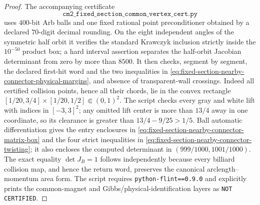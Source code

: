\documentclass[11pt]{article}
\begin{document}
\begin{proof}
The accompanying certificate
\[
 \texttt{cm2\_fixed\_section\_common\_vertex\_cert.py}
\]
uses $400$-bit Arb balls and one fixed rational point preconditioner obtained
by a declared $70$-digit decimal rounding.  On the eight independent angles
of the symmetric half orbit it verifies the standard Krawczyk inclusion
strictly inside the $10^{-50}$ product box; a hard interval assertion
separates the half-orbit Jacobian determinant from zero by more than $8500$.
It then checks, segment by segment, the declared first-hit word and the two
inequalities in
\eqref{eq:fixed-section-nearby-connector-physical-margins}, and absence of
transparent-wall crossings.  Indeed all certified collision points, hence
all their chords, lie in the convex rectangle
$[1/20,3/4]\times[1/20,1/2]\Subset(0,1)^2$.  The script checks every gray
and white lift with indices in $[-3,3]^2$; any omitted lift center is more
than $13/4$ away in one coordinate, so its clearance is greater than
$13/4-9/25>1/5$.  Ball automatic differentiation gives the
entry enclosures in
\eqref{eq:fixed-section-nearby-connector-matrix-box} and the four strict
inequalities in
\eqref{eq:fixed-section-nearby-connector-twisting}; it also encloses the
computed determinant in $(999/1000,1001/1000)$.  The exact equality
$\det J_B=1$ follows independently because every billiard collision map,
and hence the return word, preserves the canonical
arclength--momentum area form.  The script requires
\texttt{python-flint==0.9.0} and explicitly prints the common-magnet and
Gibbs/physical-identification layers as \texttt{NOT CERTIFIED}.
\end{proof}
\end{document}
